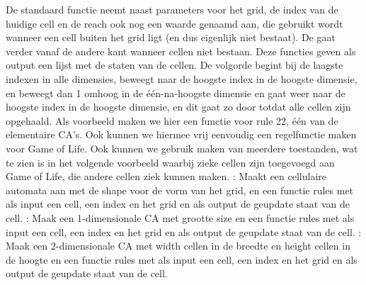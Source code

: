 {}De standaard  functie neemt naast parameters voor het grid, de index van de huidige cell en de reach ook nog een waarde genaamd  aan, die gebruikt wordt wanneer een cell buiten het grid ligt (en dus eigenlijk niet bestaat).\markdownRendererInterblockSeparator
{}De  gaat verder vanaf de andere kant wanneer cellen niet bestaan.\markdownRendererInterblockSeparator
{}Deze functies geven als output een lijst met de staten van de cellen. De volgorde begint bij de laagste indexen in alle dimensies, beweegt naar de hoogste index in de hoogste dimensie, en beweegt dan 1 omhoog in de één-na-hoogste dimensie en gaat weer naar de hoogste index in de hoogste dimensie, en dit gaat zo door totdat alle cellen zijn opgehaald.\markdownRendererInterblockSeparator
{}Als voorbeeld maken we hier een functie voor rule 22, één van de elementaire CA's.\markdownRendererInterblockSeparator
{}\markdownRendererInterblockSeparator
{}Ook kunnen we hiermee vrij eenvoudig een regelfunctie maken voor Game of Life.\markdownRendererInterblockSeparator
{}\markdownRendererInterblockSeparator
{}Ook kunnen we gebruik maken van meerdere toestanden, wat te zien is in het volgende voorbeeld waarbij zieke cellen zijn toegevoegd aan Game of Life, die andere cellen ziek kunnen maken.\markdownRendererInterblockSeparator
{}\markdownRendererInterblockSeparator
{}\markdownRendererInterblockSeparator
{}: Maakt een cellulaire automata aan met de shape voor de vorm van het grid, en een functie rules met als input een cell, een index en het grid en als output de geupdate staat van de cell.\markdownRendererInterblockSeparator
{}: Maak een 1-dimensionale CA met grootte size en een functie rules met als input een cell, een index en het grid en als output de geupdate staat van de cell.\markdownRendererInterblockSeparator
{}: Maak een 2-dimensionale CA met width cellen in de breedte en height cellen in de hoogte en een functie rules met als input een cell, een index en het grid en als output de geupdate staat van de cell.\markdownRendererInterblockSeparator
